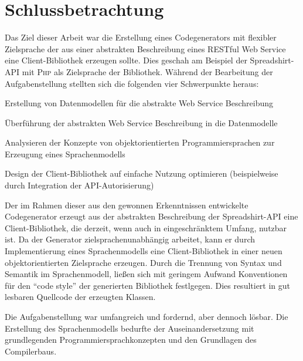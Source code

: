 \chapter{Schlussbetrachtung}
\label{chap:summary}


Das Ziel dieser Arbeit war die Erstellung eines Codegenerators mit flexibler Zielsprache der aus einer abstrakten Beschreibung eines \gls{RESTful} Web Service eine Client-Bibliothek erzeugen sollte. Dies geschah am Beispiel der Spreadshirt-\gls{API} mit \textsc{Php} als Zielsprache der Bibliothek. 
Während der Bearbeitung der Aufgabenstellung stellten sich die folgenden vier Schwerpunkte heraus:
\begin{compactitem}
    \item Erstellung von Datenmodellen für die abstrakte Web Service Beschreibung
    \item Überführung der abstrakten Web Service Beschreibung in die Datenmodelle
    \item Analysieren der Konzepte von objektorientierten Programmiersprachen zur Erzeugung eines Sprachenmodells
    \item Design der Client-Bibliothek auf einfache Nutzung optimieren (beispielweise durch Integration der \gls{API}-Autorisierung)
\end{compactitem}

Der im Rahmen dieser \thesisDesignator{} aus den gewonnen Erkenntnissen entwickelte Codegenerator erzeugt aus der abstrakten Beschreibung der Spreadshirt-\gls{API} eine Client-Bibliothek, die derzeit, wenn auch in eingeschränktem Umfang, nutzbar ist. Da der Generator zielsprachenunabhängig arbeitet, kann er durch Implementierung eines Sprachenmodells eine Client-Bibliothek in einer neuen objektorientierten Zielsprache erzeugen. Durch die Trennung von Syntax und Semantik im Sprachenmodell, ließen sich mit geringem Aufwand Konventionen für den \enquote{code style} der generierten Bibliothek festlgegen. Dies resultiert in gut lesbaren Quellcode der erzeugten Klassen.

Die Aufgabenstellung war umfangreich und fordernd, aber dennoch lösbar. Die Erstellung des Sprachenmodells bedurfte der Auseinandersetzung mit grundlegenden Programmiersprachkonzepten und den Grundlagen des Compilerbaus.


